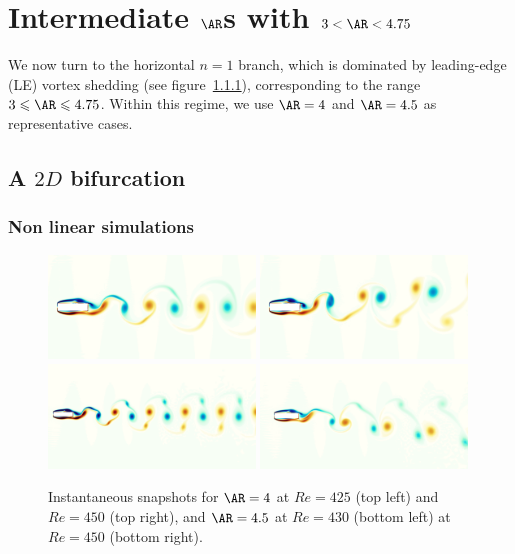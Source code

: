 \section{Intermediate $\AR$s with $3 < \AR < 4.75$}

We now turn to the horizontal $n=1$ branch, which is dominated by leading-edge (LE) vortex shedding (see figure~\ref{}), corresponding to the range $ 3 \le \AR \le 4.75$. Within this regime, we use $\AR=4$ and $\AR=4.5$ as representative cases.

\subsection{A $2D$ bifurcation}

\subsubsection{Non linear simulations}

\begin{figure}
  \centering
  \includegraphics[trim={0 100 0 100},clip,width=0.49\textwidth]{./fig/vort_Re425_25.png}
  \includegraphics[trim={0 100 0 100},clip,width=0.49\textwidth]{./fig/vort_Re450_25.png}  
  \includegraphics[trim={0 100 0 100},clip,width=0.49\textwidth]{./fig/AR4p5/vort_Re430_25.png}
  \includegraphics[trim={0 100 0 100},clip,width=0.49\textwidth]{./fig/AR4p5/vort_Re450_25.png}
  \caption{Instantaneous snapshots for $\AR=4$ at $Re=425$ (top left) and $Re=450$ (top right), and $\AR=4.5$ at $Re=430$ (bottom left) at $Re=450$ (bottom right).}
  \label{fig:snap_ar4_ar4p5}
\end{figure}

